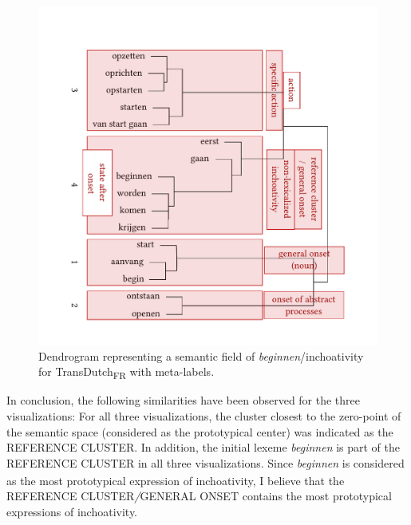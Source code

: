 \begin{figure}
\includegraphics[width=\textwidth]{figures/tree86.pdf}
\caption{\label{fig:4:83}  Dendrogram representing a semantic field of \textit{beginnen}/inchoativity for TransDutch\textsubscript{FR} with meta-labels.}
\end{figure}

In conclusion, the following similarities have been observed for the three visualizations: For all three visualizations, the cluster closest to the zero-point of the semantic space (considered as the prototypical center) was indicated as the REFERENCE CLUSTER. In addition, the initial lexeme \textit{beginnen} is part of the REFERENCE CLUSTER in all three visualizations.\textsubscript{} Since \textit{beginnen} is considered as the most prototypical expression of inchoativity, I believe that the REFERENCE CLUSTER\textit{/}GENERAL ONSET contains the most prototypical expressions of inchoativity. 

